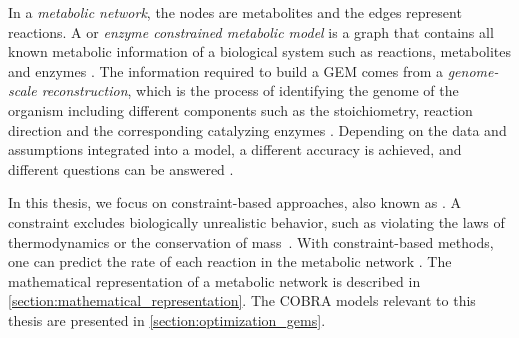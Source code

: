 In a \textit{metabolic network}, the nodes are metabolites %
and the edges represent reactions. 
A  or \textit{enzyme constrained metabolic model} is a graph that contains all known metabolic information of a biological system such as reactions, metabolites and enzymes \cite{GEMs}. \vspace*{-\baselineskip}
\newpage
The information required to build a GEM comes from a \textit{genome-scale reconstruction}, which is the process of identifying the genome of the organism including different components such as the stoichiometry, reaction direction and the corresponding catalyzing enzymes \cite{fba_applications_and_challenges} . 
Depending on the data and assumptions integrated into a model, a different accuracy is achieved, and different questions can be answered \cite{fba_applications_and_challenges}. 

In this thesis, we focus on constraint-based approaches, also known as . A constraint excludes biologically unrealistic behavior, such as violating the laws of thermodynamics or the conservation of mass~\cite{intro_computational_systems_biology}.
With constraint-based methods, one can predict the 
rate of each reaction in the metabolic network \cite{intro_computational_systems_biology}.
The mathematical representation of a metabolic network is described in \cref{section:mathematical_representation}.
The COBRA models relevant to this thesis are presented in \cref{section:optimization_gems}.

